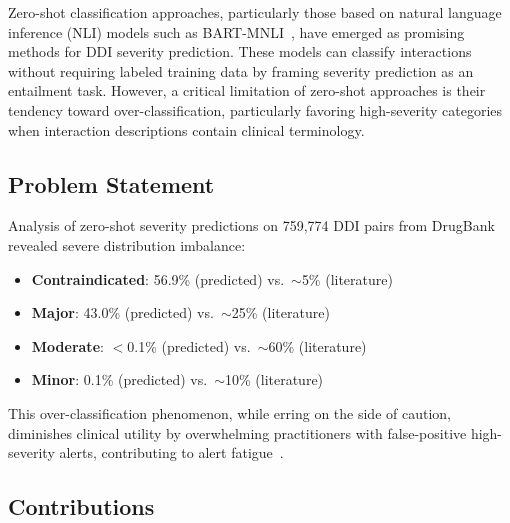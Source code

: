 \documentclass[11pt,a4paper]{article}
\newcommand{\bart}{BART-MNLI}
\newcommand{\ninteractions}{759,774}
\begin{document}
Zero-shot classification approaches, particularly those based on natural language inference (NLI) models such as \bart{}~\citep{lewis2020bart}, have emerged as promising methods for DDI severity prediction. These models can classify interactions without requiring labeled training data by framing severity prediction as an entailment task. However, a critical limitation of zero-shot approaches is their tendency toward over-classification, particularly favoring high-severity categories when interaction descriptions contain clinical terminology.

\subsection{Problem Statement}

Analysis of zero-shot severity predictions on \ninteractions{} DDI pairs from DrugBank revealed severe distribution imbalance:
\begin{itemize}
    \item \textbf{Contraindicated}: 56.9\% (predicted) vs.\ $\sim$5\% (literature)
    \item \textbf{Major}: 43.0\% (predicted) vs.\ $\sim$25\% (literature)
    \item \textbf{Moderate}: $<$0.1\% (predicted) vs.\ $\sim$60\% (literature)
    \item \textbf{Minor}: 0.1\% (predicted) vs.\ $\sim$10\% (literature)
\end{itemize}

This over-classification phenomenon, while erring on the side of caution, diminishes clinical utility by overwhelming practitioners with false-positive high-severity alerts, contributing to alert fatigue~\citep{van2013frequency}.

\subsection{Contributions}
\end{document}
